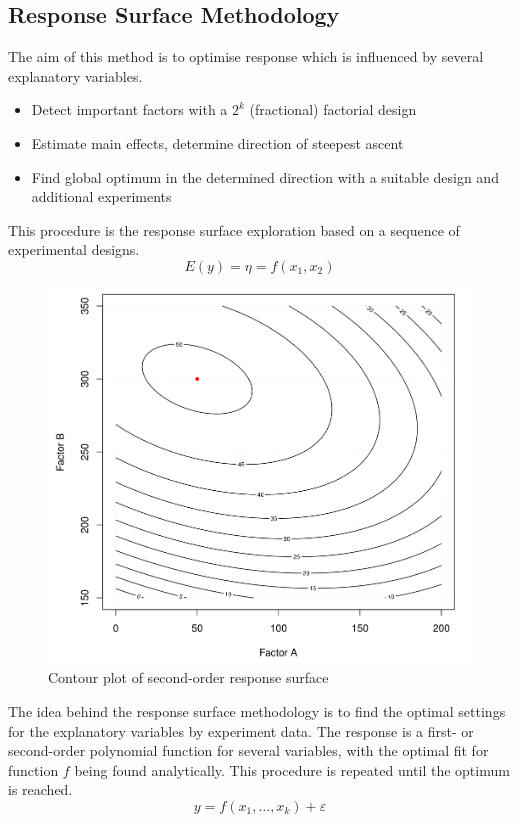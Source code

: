 \documentclass[11pt]{article}
\theoremstyle{definition}
\begin{document}
\subsection{Response Surface Methodology}
The aim of this method is to optimise response which is influenced by several explanatory variables.
\begin{itemize}
	\item Detect important factors with a $2^k$ (fractional) factorial design
	\item Estimate main effects, determine direction of steepest ascent
	\item Find global optimum in the determined direction with a suitable design and additional experiments
\end{itemize}
This procedure is the response surface exploration based on a sequence of experimental designs.
\begin{equation*}
	E(y) = \eta = f(x_1, x_2)
\end{equation*}

\begin{figure}[tbh]
	\centering
	\includegraphics[width=0.6\linewidth]{img/contour_plot_second_order_response_surface}
	\caption{Contour plot of second-order response surface}
	\label{fig:contourplotsecondorderresponsesurface}
\end{figure}

The idea behind the response surface methodology is to find the optimal settings for the explanatory variables by experiment data. The response is a first- or second-order polynomial function for several variables, with the optimal fit for function $f$ being found analytically. This procedure is repeated until the optimum is reached.
\begin{equation*} 
	y=f(x_1,\dots,x_k) + \varepsilon \tag{fit response function}
\end{equation*}
\end{document}
